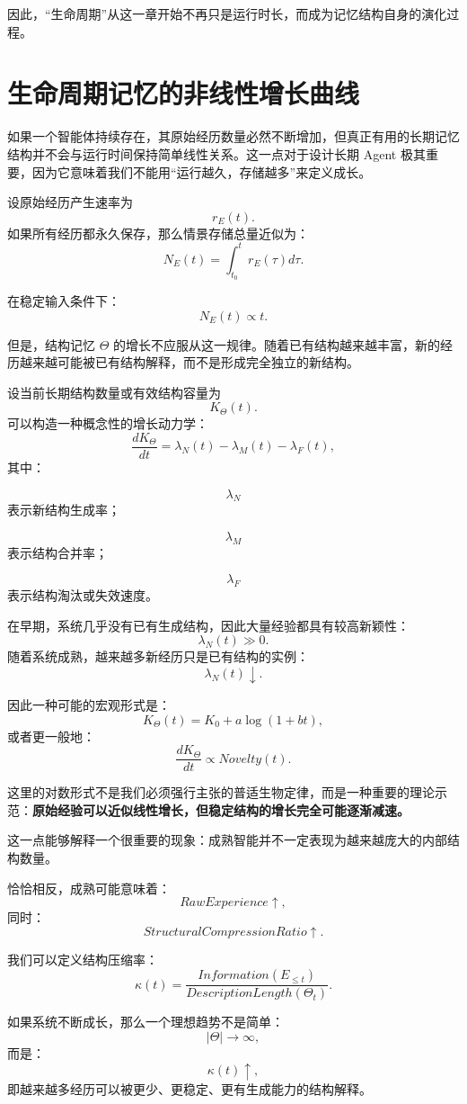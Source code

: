 因此，“生命周期”从这一章开始不再只是运行时长，而成为记忆结构自身的演化过程。

\section{生命周期记忆的非线性增长曲线}

如果一个智能体持续存在，其原始经历数量必然不断增加，但真正有用的长期记忆结构并不会与运行时间保持简单线性关系。这一点对于设计长期 Agent 极其重要，因为它意味着我们不能用“运行越久，存储越多”来定义成长。

设原始经历产生速率为
\[
r_E(t).
\]
如果所有经历都永久保存，那么情景存储总量近似为：
\[
N_E(t)
=
\int_{t_0}^{t}
r_E(\tau)d\tau.
\]

在稳定输入条件下：
\[
N_E(t)\propto t.
\]

但是，结构记忆 \(\Theta\) 的增长不应服从这一规律。随着已有结构越来越丰富，新的经历越来越可能被已有结构解释，而不是形成完全独立的新结构。

设当前长期结构数量或有效结构容量为
\[
K_\Theta(t).
\]
可以构造一种概念性的增长动力学：
\[
\frac{dK_\Theta}{dt}
=
\lambda_N(t)
-
\lambda_M(t)
-
\lambda_F(t),
\]
其中：

\[
\lambda_N
\]
表示新结构生成率；

\[
\lambda_M
\]
表示结构合并率；

\[
\lambda_F
\]
表示结构淘汰或失效速度。

在早期，系统几乎没有已有生成结构，因此大量经验都具有较高新颖性：
\[
\lambda_N(t)\gg0.
\]
随着系统成熟，越来越多新经历只是已有结构的实例：
\[
\lambda_N(t)\downarrow.
\]

因此一种可能的宏观形式是：
\[
K_\Theta(t)
=
K_0
+
a\log(1+bt),
\]
或者更一般地：
\[
\frac{dK_\Theta}{dt}
\propto
Novelty(t).
\]

这里的对数形式不是我们必须强行主张的普适生物定律，而是一种重要的理论示范：\textbf{原始经验可以近似线性增长，但稳定结构的增长完全可能逐渐减速。}

这一点能够解释一个很重要的现象：成熟智能并不一定表现为越来越庞大的内部结构数量。

恰恰相反，成熟可能意味着：
\[
RawExperience\uparrow,
\]
同时：
\[
StructuralCompressionRatio\uparrow.
\]

我们可以定义结构压缩率：
\[
\kappa(t)
=
\frac{
Information(E_{\leq t})
}{
DescriptionLength(\Theta_t)
}.
\]

如果系统不断成长，那么一个理想趋势不是简单：
\[
|\Theta|\rightarrow\infty,
\]
而是：
\[
\kappa(t)\uparrow,
\]
即越来越多经历可以被更少、更稳定、更有生成能力的结构解释。

